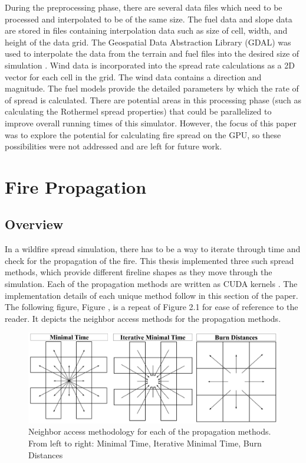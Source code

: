 During the preprocessing phase, there are several data files which need to be processed and interpolated to be of the same size. The fuel data and slope data are stored in files containing interpolation data such as size of cell, width, and height of the data grid. The Geospatial Data Abstraction Library (GDAL) was used to interpolate the data from the terrain and fuel files into the desired size of simulation \cite{GDAL}. Wind data is incorporated into the spread rate calculations as a 2D vector for each cell in the grid. The wind data contains a direction and magnitude. The fuel models provide the detailed parameters by which the rate of of spread is calculated. There are potential areas in this processing phase (such as calculating the Rothermel spread properties) that could be parallelized to improve overall running times of this simulator. However, the focus of this paper was to explore the potential for calculating fire spread on the GPU, so these possibilities were not addressed and are left for future work. 


\section{Fire Propagation}
\subsection{Overview}
In a wildfire spread simulation, there has to be a way to iterate through time and check for the propagation of the fire. This thesis implemented three such spread methods, which provide different fireline shapes as they move through the simulation. Each of the propagation methods are written as CUDA kernels \cite{cuda}. The implementation details of each unique method follow in this section of the paper. The following figure, Figure \label{fig:spreadTypes_2}, is a repeat of Figure 2.1 for ease of reference to the reader. It depicts the neighbor access methods for the propagation methods.

\begin{figure}%
\centering
\includegraphics[width=\linewidth]{figures/background/spread_methods.PNG}
\caption{Neighbor access methodology for each of the propagation methods. From left to right: Minimal Time, Iterative Minimal Time, Burn Distances}
\label{fig:spreadTypes_2}
\end{figure}

